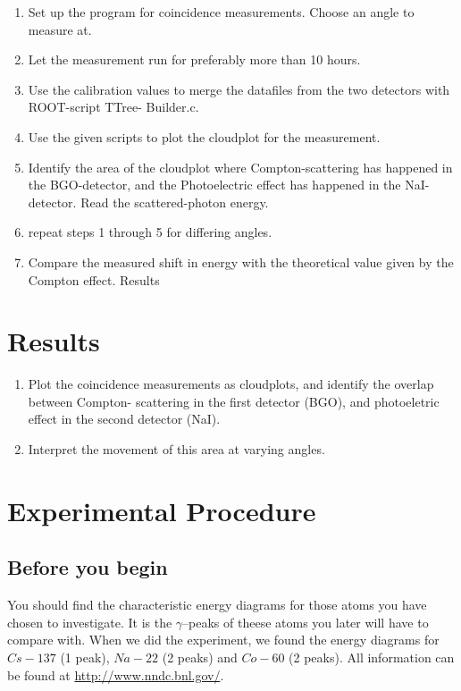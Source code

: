 \documentclass[a4paper, oneside, onecolumn, 11pt]{memoir}
\begin{document}
\begin{enumerate}
\item Set up the program for coincidence measurements. Choose an angle to
    measure at.
\item Let the measurement run for preferably more than 10 hours.  
\item Use the calibration values to merge the datafiles from the two detectors
    with ROOT-script TTree- Builder.c.
\item Use the given scripts to plot the cloudplot for the measurement.
\item Identify the area of the cloudplot where Compton-scattering has happened
    in the BGO-detector, and the Photoelectric effect has happened in the
    NaI-detector. Read the scattered-photon energy. 
\item repeat steps 1 through 5 for differing angles.
\item Compare the measured shift in energy with the theoretical value given by the Compton effect.  Results
\end{enumerate}

\section{Results}
\begin{enumerate}
\item Plot the coincidence measurements as cloudplots, and identify the overlap between Compton- scattering in the first detector (BGO), and photoeletric effect in the second detector (NaI).
\item Interpret the movement of this area at varying angles.
\end{enumerate}

\section{Experimental Procedure}
\subsection{Before you begin}
You should find the characteristic energy diagrams for those atoms you have
chosen to investigate. It is the $\gamma$–peaks of theese atoms you later will
have to compare with. When we did the experiment, we found the energy diagrams
for $Cs-137$ (1 peak), $Na-22$ (2 peaks) and $Co-60$ (2 peaks).  All
information can be found at \url{http://www.nndc.bnl.gov/}.
\end{document}
